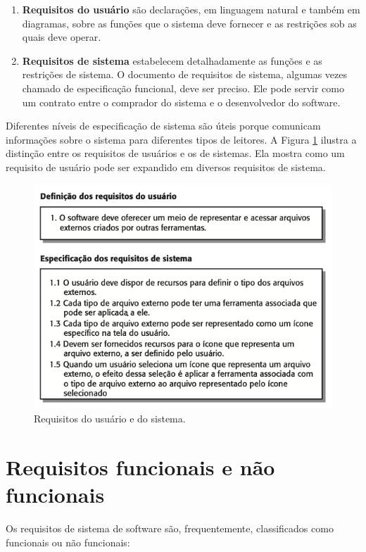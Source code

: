 \begin{enumerate}
	\item \textbf{Requisitos do usuário} são declarações, em linguagem natural e também em diagramas, sobre as funções que o sistema deve fornecer e as restrições sob as quais deve operar.
	\item \textbf{Requisitos de sistema} estabelecem detalhadamente as funções e as restrições de sistema. O documento de requisitos de sistema, algumas vezes chamado de especificação funcional, deve ser preciso. Ele pode servir como um contrato entre o comprador do sistema e o desenvolvedor do software.
\end{enumerate}

Diferentes níveis de especificação de sistema são úteis porque comunicam informações sobre o sistema para diferentes tipos de leitores. A Figura \ref{fig:req-u-s} ilustra a distinção entre os requisitos de usuários e os de sistemas. Ela mostra como um requisito de usuário pode ser expandido em diversos requisitos de sistema.

\begin{figure}[H]
	\centering
	\includegraphics[scale=0.6]{imagens/req-u-s.png}
	\caption{Requisitos do usuário e do sistema. \cite{sommerville2003engenharia}}
	\label{fig:req-u-s}
\end{figure}

\section{Requisitos funcionais e não funcionais}

Os requisitos de sistema de software são, frequentemente, classificados como funcionais ou não funcionais:


